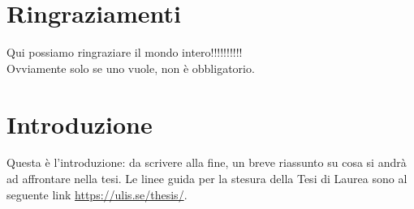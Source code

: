 \documentclass[12pt,a4paper,openright,twoside]{report}
\begin{document}

\restoregeometry


\clearpage{\pagestyle{empty}\cleardoublepage}
\renewcommand{\abstractname}{Abstract}
{}
\begin{abstract}
    Questo \`e l'abstract: un riassunto dell'introduzione di massimo 300 parole. Da scrivere alla fine.
\end{abstract}


\clearpage{\pagestyle{empty}\cleardoublepage}
\chapter*{Ringraziamenti}
{}
Qui possiamo ringraziare il mondo intero!!!!!!!!!!\\
Ovviamente solo se uno vuole, non \`e obbligatorio.

\clearpage{\pagestyle{empty}\cleardoublepage}



\tableofcontents %
\rhead[\fancyplain{}{\bfseries\leftmark}]{\fancyplain{}{\bfseries\thepage}}



\clearpage{\pagestyle{empty}\cleardoublepage}
\renewcommand{\listfigurename}{Elenco delle Figure}
{}
\listoffigures %



\clearpage{\pagestyle{empty}\cleardoublepage}
\renewcommand{\listtablename}{Elenco delle Tabelle}
{}
\listoftables %



\clearpage{\pagestyle{empty}\cleardoublepage}
\chapter{Introduzione} 
\lhead[\fancyplain{}{\bfseries\thepage}]{\fancyplain{}{\bfseries\rightmark}}
Questa \`e l'introduzione: da scrivere alla fine, un breve riassunto su cosa si andr\`a ad affrontare nella tesi.
Le linee guida per la stesura della Tesi di Laurea sono al seguente link \href{https://ulis.se/thesis/}{https://ulis.se/thesis/}.
\end{document}

